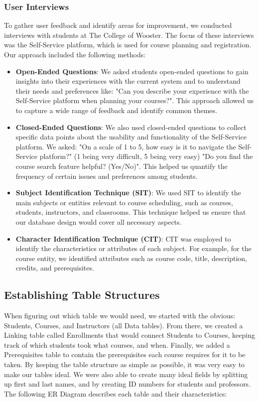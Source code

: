 \documentclass[12pt]{article}
\begin{document}
\subsubsection*{User Interviews}

To gather user feedback and identify areas for improvement, we conducted interviews with students at The College of Wooster. The focus of these interviews was the Self-Service platform, which is used for course planning and registration. Our approach included the following methods:

\begin{itemize}
  \item  \textbf{Open-Ended Questions}:  We asked students open-ended questions to gain insights into their experiences with the current system and to understand their needs and preferences like: "Can you describe your experience with the Self-Service platform when planning your courses?". This approach allowed us to capture a wide range of feedback and identify common themes.
  \item \textbf{Closed-Ended Questions}: We also used closed-ended questions to collect specific data points about the usability and functionality of the Self-Service platform. We asked: "On a scale of 1 to 5, how easy is it to navigate the Self-Service platform?" (1 being very difficult, 5 being very easy) "Do you find the course search feature helpful? (Yes/No)". This helped us quantify the frequency of certain issues and preferences among students.
  \item \textbf{Subject Identification Technique (SIT)}: We used SIT to identify the main subjects or entities relevant to course scheduling, such as courses, students, instructors, and classrooms. This technique helped us ensure that our database design would cover all necessary aspects.
  \item \textbf{Character Identification Technique (CIT)}: CIT was employed to identify the characteristics or attributes of each subject. For example, for the course entity, we identified attributes such as course code, title, description, credits, and prerequisites.
\end{itemize}


\subsection{Establishing Table Structures}
When figuring out which table we would need, we started with the obvious: Students, Courses, and Instructors (all Data tables). From there, we created a Linking table called Enrollments that would connect Students to Courses, keeping track of which students took what courses, and when. Finally, we added a Prerequisites table to contain the prerequisites each course requires for it to be taken. By keeping the table structure as simple as possible, it was very easy to make our tables ideal. We were also able to create many ideal fields by splitting up first and last names, and by creating ID numbers for students and professors. The following ER Diagram describes each table and their characteristics:
\end{document}
